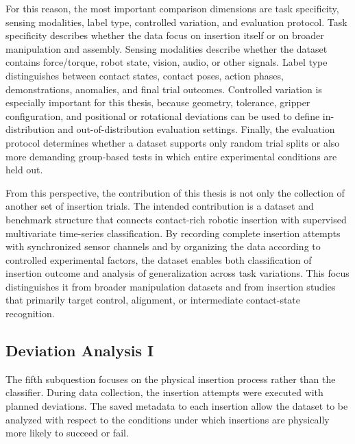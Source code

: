 For this reason, the most important comparison dimensions are task specificity, sensing modalities, label type, controlled variation, and evaluation protocol. Task specificity describes whether the data focus on insertion itself or on broader manipulation and assembly. Sensing modalities describe whether the dataset contains force/torque, robot state, vision, audio, or other signals. Label type distinguishes between contact states, contact poses, action phases, demonstrations, anomalies, and final trial outcomes. Controlled variation is especially important for this thesis, because geometry, tolerance, gripper configuration, and positional or rotational deviations can be used to define in-distribution and out-of-distribution evaluation settings. Finally, the evaluation protocol determines whether a dataset supports only random trial splits or also more demanding group-based tests in which entire experimental conditions are held out.

From this perspective, the contribution of this thesis is not only the collection of another set of insertion trials. The intended contribution is a dataset and benchmark structure that connects contact-rich robotic insertion with supervised multivariate time-series classification. By recording complete insertion attempts with synchronized sensor channels and by organizing the data according to controlled experimental factors, the dataset enables both classification of insertion outcome and analysis of generalization across task variations. This focus distinguishes it from broader manipulation datasets and from insertion studies that primarily target control, alignment, or intermediate contact-state recognition.


\subsection{Deviation Analysis I}
The fifth subquestion focuses on the physical insertion process rather than the classifier. During data collection, the insertion attempts were executed with planned deviations. The saved metadata to each insertion allow the dataset to be analyzed with respect to the conditions under which insertions are physically more likely to succeed or fail.

